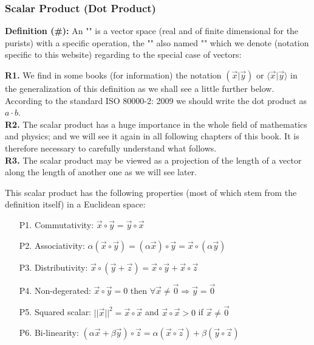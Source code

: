 	\pagebreak	
	\subsubsection{Scalar Product (Dot Product)}
	\textbf{Definition (\#\mydef):} An "" is a vector space (real and of finite dimensional for the purists) with a specific operation, the "" also named "" which we denote (notation specific to this website) regarding to the special case of vectors:
	
	\begin{tcolorbox}[title=Remarks,colframe=black,arc=10pt]
	\textbf{R1.} We find in some books (for information) the notation $\left( \vec{x}|\vec{y}\right)$ or $\langle \vec{x} | \vec{y} \rangle$ in the generalization of this definition as we shall see a little further below. According to the standard ISO 80000-2: 2009 we should write the dot product as $a\cdot b$.\\
	
	\textbf{R2.} The scalar product has a huge importance in the whole field of mathematics and physics; and we will see it again in all following chapters of this book. It is therefore necessary to carefully understand what follows.\\
	
	\textbf{R3.} The scalar product may be viewed as a projection of the length of a vector along the length of another one as we will see later.
	\end{tcolorbox}	
	This scalar product has the following properties (most of which stem from the definition itself) in a Euclidean space:
	\begin{enumerate}
		\item[P1.] Commutativity: $\vec{x}\circ\vec{y}=\vec{y}\circ\vec{x}$
		\item[P2.] Associativity: $\alpha(\vec{x}\circ\vec{y})=(\alpha\vec{x})\circ\vec{y}=\vec{x}\circ(\alpha\vec{y}) $
		\item[P3.] Distributivity: $\vec{x}\circ(\vec{y}+\vec{z})=\vec{x}\circ\vec{y}+\vec{x}\circ\vec{z}$
		\item[P4.] Non-degerated: $\vec{x}\circ\vec{y}=0$ then $\forall\vec{x}\neq\vec{0}\Rightarrow \vec{y}=\vec{0}$
		\item[P5.] Squared scalar: $||\vec{x}||^2=\vec{x}\circ\vec{x}$ and $\vec{x}\circ\vec{x}>0$ if $\vec{x}\neq \vec{0}$
		\item[P6.] Bi-linearity: $(\alpha\vec{x}+\beta\vec{y})\circ\vec{z}=\alpha(\vec{x}\circ	\vec{z})+\beta(\vec{y}\circ\vec{z})$
	\end{enumerate}

